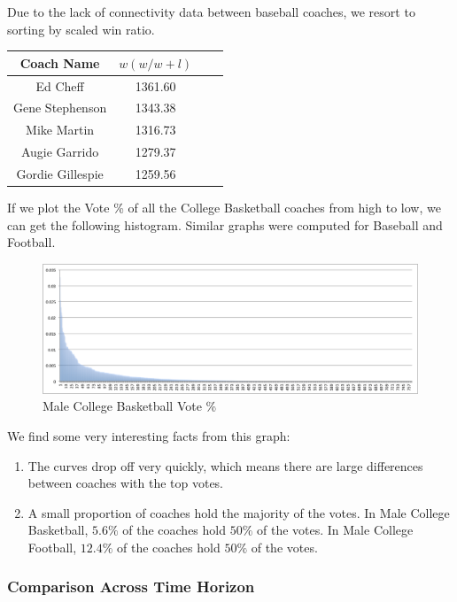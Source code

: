 \documentclass[11pt,notitlepage]{article}
\begin{document}
Due to the lack of connectivity data between baseball coaches, we resort to sorting by scaled win ratio.
\begin{center}
\begin{tabular}{ | c | c | c| c | }
\hline
Coach Name       & $w (w / w + l)$ \\\hline
Ed Cheff         & 1361.60 \\\hline
Gene Stephenson  & 1343.38 \\\hline
Mike Martin      & 1316.73 \\\hline
Augie Garrido    & 1279.37 \\\hline
Gordie Gillespie & 1259.56 \\
\hline
\end{tabular}
\end{center}

\noindent If we plot the Vote \% of all the College Basketball coaches from high to low, we can get the following histogram. Similar graphs were computed for Baseball and Football.

\begin{figure}[H]
      \caption{Male College Basketball Vote \%}
      \centering
      \includegraphics[width=1\textwidth]{graphs/basketball_score_dist.png}
 \end{figure}

\noindent We find some very interesting facts from this graph:

\begin{enumerate}
\item The curves drop off very quickly, which means there are large differences between coaches with the top votes.
\item A small proportion of coaches hold the majority of the votes. In Male College Basketball, $5.6\%$ of the coaches hold $50\%$ of the votes. In Male College Football, $12.4\%$ of the coaches hold $50\%$ of the votes.
\end{enumerate}

\subsubsection*{Comparison Across Time Horizon}
\end{document}
